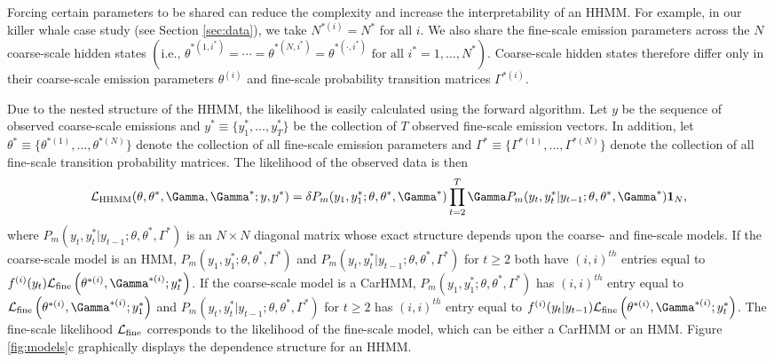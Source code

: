 Forcing certain parameters to be shared can reduce the complexity and increase the interpretability of an HHMM. For example, in our killer whale case study (see Section \ref{sec:data}), we take $N^{*(i)} = N^*$ for all $i$. We also share the fine-scale emission parameters across the $N$ coarse-scale hidden states $\left( \text{i.e., } \theta^{*(1,i^*)} = \cdots = \theta^{*(N,i^*)} = \theta^{*(\cdot,i^*)} \text{ for all } i^* = 1, \ldots, N^* \right)$. Coarse-scale hidden states therefore differ only in their coarse-scale emission parameters $\theta^{(i)}$ and fine-scale probability transition matrices $\Gamma^{*(i)}$.

Due to the nested structure of the HHMM, the likelihood is easily calculated using the forward algorithm.
%
Let $y$ be the sequence of observed coarse-scale emissions and
$y^* \equiv \{y^*_1, \ldots,y^*_T\}$ be the collection of $T$ observed fine-scale emission vectors.
%
In addition, let $\theta^* \equiv \{\theta^{*(1)}, \ldots, \theta^{*(N)}\}$ denote the collection of all fine-scale emission parameters and $\Gamma^* \equiv \{\Gamma^{*(1)}, \ldots, \Gamma^{*(N)}\}$ denote the collection of all fine-scale transition probability matrices. The likelihood of the observed data is then
%
\begin{equation}
    \calL_{\text{HHMM}}(\theta,\theta^*,\Gamma,\Gamma^*;y,y^*) = \delta P_m(y_1,y_1^*;\theta,\theta^*,\Gamma^*) \prod_{t=2}^T \Gamma P_m(y_t,y_t^*|y_{t-1};\theta,\theta^*,\Gamma^*) \mathbf{1}_N,
    \label{eqn:HHMM_likelihood}
\end{equation}
%
where $P_m(y_t,y_t^*|y_{t-1};\theta,\theta^*,\Gamma^*)$ is an $N \times N$ diagonal matrix whose exact structure depends upon the coarse- and fine-scale models. If the coarse-scale model is an HMM, $P_m(y_1,y_1^*;\theta,\theta^*,\Gamma^*)$ and $P_m(y_t,y_t^*|y_{t-1};\theta,\theta^*,\Gamma^*)$ for $t \geq 2$ both have $(i,i)^{th}$ entries equal to 
$f^{(i)}(y_t)\calL_{\text{fine}}\left(\theta^{*(i)},
\Gamma^{*(i)};y_t^*\right)$. 
If the coarse-scale model is a CarHMM, $P_m(y_1,y_1^*;\theta,\theta^*,\Gamma^*)$ has $(i,i)^{th}$ entry equal to $\calL_{\text{fine}}\left(\theta^{*(i)},
\Gamma^{*(i)};y_1^*\right)$ and $P_m(y_t,y_t^*|y_{t-1};\theta,\theta^*,\Gamma^*)$ for $t \geq 2$ has $(i,i)^{th}$ entry equal to $f^{(i)}(y_t|y_{t-1})\calL_{\text{fine}}\left(\theta^{*(i)},
\Gamma^{*(i)};y_t^*\right)$.
The fine-scale likelihood $\mathcal{L}_{\text{fine}}$ corresponds to the likelihood of the fine-scale model, which can be either a CarHMM or an HMM. Figure \ref{fig:models}c graphically displays the dependence structure for an HHMM.
%

